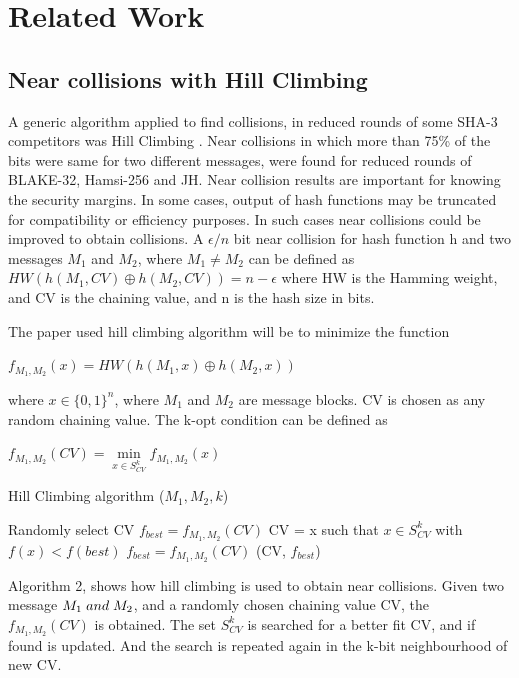 \documentclass[12pt]{artikel3}                  %
\begin{document}
\section{Related Work}

\subsection{Near collisions with Hill Climbing}

A generic algorithm applied to find collisions, in reduced rounds of some SHA-3 competitors was Hill Climbing
\cite{00029}. Near collisions in which more than 75\% of the bits were same for two different messages, were found 
for reduced rounds of BLAKE-32, Hamsi-256 and JH. Near collision results are important for knowing the security
margins. In some cases, output of hash functions may be truncated for compatibility or efficiency purposes. In 
such cases near collisions could be improved to obtain collisions. A $\epsilon / n $ bit near collision for hash 
function h and two messages $M_{1}$ and $M_{2}$, where $M_{1} \neq M_{2}$ can be defined as
$HW( h( M_{1}, CV ) \oplus h( M_{2}, CV ) ) = n - \epsilon $ where HW is the Hamming weight, and CV is the chaining
value, and n is the hash size in bits.

The paper used hill climbing algorithm will be to minimize the function 

$f_{M_{1}, M_{2}}(x) = HW( h(M_{1}, x) \oplus h(M_{2}, x) )$

where $x \in \{0, 1\}^{n}$, where $M_{1}$ and $M_{2}$ are message blocks. CV is chosen as any random chaining value.
The k-opt condition can be defined as 

$f_{M_{1}, M_{2}} (CV) =  \min\limits_{x \in S^{k}_{CV}} f_{M_{1}, M_{2}} (x)$ 

\begin{algorithm}
  \caption{ Hill Climbing algorithm ($M_{1}, M_{2}, k$) }
  \begin{algorithmic}[1]
    \State Randomly select CV
    \State $f_{best} = f_{M_{1}, M_{2}}(CV)$
    \State {}
    \State CV = x such that $x \in S^{k}_{CV}$ with $f(x) < f(best)$
    \State $f_{best} = f_{M_{1}, M_{2}}(CV)$
    \State \EndWhile
    \State \Return (CV, $f_{best}$)
  \end{algorithmic}
\end{algorithm}

Algorithm 2, shows how hill climbing is used to obtain near collisions. Given two message $M_{1} \thickspace and \thickspace M_{2}$, 
and a randomly chosen chaining value CV, the $f_{M_{1}, M_{2}}(CV)$ is obtained. The set $S^{k}_{CV}$ is searched
for a better fit CV, and if found is updated. And the search is repeated again in the k-bit neighbourhood of new CV.
\end{document}
